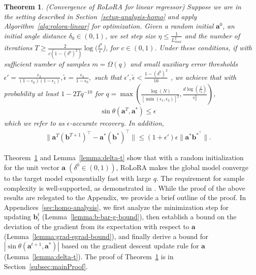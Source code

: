 \documentclass{article}
\theoremstyle{plain}
\newtheorem{theorem}{Theorem}[section]
\theoremstyle{definition}
\theoremstyle{remark}
\begin{document}
\begin{theorem}(Convergence of RoLoRA for linear regressor) \label{convergence-1}
    Suppose we are in the setting described in Section~\ref{setup-analysis-homo} and apply Algorithm~\ref{alg:rolora-linear} for optimization. Given a random initial $\mathbf{a}^0$, an initial angle distance $\delta_0 \in (0,1)$, we set step size $\eta  \leq \frac{1}{L_{max}^2}$ and the number of iterations $T \geq \frac{2}{c(1-(\delta^{0})^2)}\log (\frac{\delta^0}{\epsilon}$), for $c \in (0,1)$. Under these conditions, if with sufficient number of samples $m = \Omega(q)$ and small auxiliary error thresholds $\epsilon'=\frac{\epsilon_2}{(1-\epsilon_0)(1-\epsilon_1)},\tilde{\epsilon}=\frac{\epsilon_3}{1-\epsilon_0},$ such that $ \epsilon', \tilde{\epsilon} < \frac{1-(\delta^0)^2}{16}$ , we achieve that with probability at least $1-2Tq^{-10}$ for $q=\max\left(\frac{\log(N)}{[\min(\epsilon_1,\epsilon_2)]^2},\frac{d\log(\frac{2}{\epsilon_0})}{\epsilon_2^2}\right)$,
\begin{align}
\sin \theta (\mathbf{a}^T, \mathbf{a}^*)\leq \epsilon \nonumber
\end{align}
which we refer to as $\epsilon$-accurate recovery. In addition, 
\begin{align}
    \lVert \mathbf{a}^T(\mathbf{b}^{T+1})^\top- \mathbf{a}^* ({\mathbf{b}}^*)^\top\rVert \leq (1+\epsilon')\epsilon \lVert  \mathbf a^* {\mathbf{b}}^{*^\top}\rVert. \nonumber 
\end{align}
\end{theorem}
\vspace{-0.2cm}
Theorem~\ref{convergence-1} and Lemma~\ref{lemma:delta-t} show that with a random initialization for the unit vector $\mathbf{a}$ $(\delta^0\in (0,1))$, RoLoRA makes the global model converge to the target model exponentially fast with large $q$. The requirement for sample complexity is well-supported, as demonstrated in \cite{collins2022fedavgfinetuninglocal, du2021fewshot}. While the proof of the above results are relegated to the Appendix, we provide a brief outline of the proof. In Appendices~\ref{sec:homo-analysis}, we first analyze the minimization step for updating ${\mathbf{b}_i^t}$ (Lemma~\ref{lemma:b-bar-g-bound}), then establish a bound on the deviation of the gradient from its expectation with respect to $\mathbf{a}$ (Lemma~\ref{lemma:grad-egrad-bound}), and finally derive a bound for $|\sin \theta (\mathbf{a}^{t+1},\mathbf{a}^*)|$ based on the gradient descent update rule for $\mathbf{a}$ (Lemma~\ref{lemma:delta-t}). The proof of Theorem~\ref{convergence-1} is in Section~\ref{subsec:mainProof}.
\end{document}
